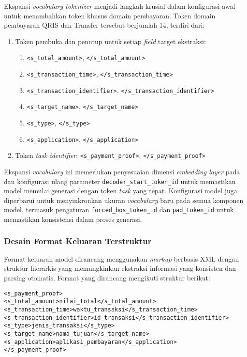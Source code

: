 Ekspansi \emph{vocabulary tokenizer} menjadi langkah krusial dalam konfigurasi awal untuk menambahkan token khusus domain pembayaran. Token domain pembayaran QRIS dan Transfer tersebut berjumlah 14, terdiri dari:
\begin{enumerate}
    \item Token pembuka dan penutup untuk setiap \emph{field} target ekstraksi:
    \begin{enumerate}
        \item \texttt{<s\_total\_amount>}, \texttt{</s\_total\_amount>}
        \item \texttt{<s\_transaction\_time>}, \texttt{</s\_transaction\_time>}
        \item \texttt{<s\_transaction\_identifier>}, \texttt{</s\_transaction\_identifier>}
        \item \texttt{<s\_target\_name>}, \texttt{</s\_target\_name>}
        \item \texttt{<s\_type>}, \texttt{</s\_type>}
        \item \texttt{<s\_application>}, \texttt{</s\_application>}
    \end{enumerate}
    \item Token \emph{task identifier}: \texttt{<s\_payment\_proof>}, \texttt{</s\_payment\_proof>}
\end{enumerate}

Ekspansi \emph{vocabulary} ini memerlukan penyesuaian dimensi \emph{embedding layer} pada \decoder{} dan konfigurasi ulang parameter \texttt{decoder\_start\_token\_id} untuk memastikan model memulai generasi dengan token \emph{task} yang tepat. Konfigurasi model juga diperbarui untuk menyinkronkan ukuran \emph{vocabulary} baru pada semua komponen model, termasuk pengaturan \texttt{forced\_bos\_token\_id} dan \texttt{pad\_token\_id} untuk memastikan konsistensi dalam proses generasi.

\subsubsection{Desain Format Keluaran Terstruktur}
\label{subsubsec:desain-format-keluaran}

Format keluaran model dirancang menggunakan \emph{markup} berbasis XML dengan struktur hierarkis yang memungkinkan ekstraksi informasi yang konsisten dan parsing otomatis. Format yang dirancang mengikuti struktur berikut:

\begin{verbatim}
<s_payment_proof>
<s_total_amount>nilai_total</s_total_amount>
<s_transaction_time>waktu_transaksi</s_transaction_time>
<s_transaction_identifier>id_transaksi</s_transaction_identifier>
<s_type>jenis_transaksi</s_type>
<s_target_name>nama_tujuan</s_target_name>
<s_application>aplikasi_pembayaran</s_application>
</s_payment_proof>
\end{verbatim}

